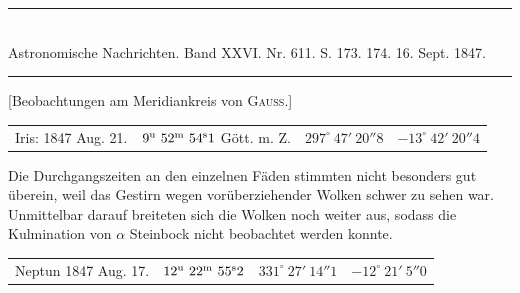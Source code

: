 \clearpage
{}
\begin{center}
\rule{0.55\linewidth}{0.4pt}\\[2pt]
Astronomische Nachrichten. Band XXVI. Nr. 611. S. 173. 174. 16. Sept. 1847.\\[2pt]
\rule{0.55\linewidth}{0.4pt}
\end{center}
\begin{center}[Beobachtungen am Meridiankreis von \textsc{Gauss}.]\end{center}

\begin{center}
\small
\setlength{\tabcolsep}{3pt}
\begin{tabular}{lrll}
Iris: 1847 Aug. 21. & $9^{\rm u}\ 52^{\rm m}\ 54^{\rm s}1$ Gött. m. Z. & $297^\circ\ 47'\ 20''8$ & $-13^\circ\ 42'\ 20''4$ \\
\end{tabular}
\end{center}

Die Durchgangszeiten an den einzelnen Fäden stimmten nicht besonders gut überein, weil das Gestirn wegen vorüberziehender Wolken schwer zu sehen war. Unmittelbar darauf breiteten sich die Wolken noch weiter aus, sodass die Kulmination von $\alpha$ Steinbock nicht beobachtet werden konnte.

\begin{center}
\small
\setlength{\tabcolsep}{4pt}
\begin{tabular}{lrrr}
Neptun 1847 Aug. 17. & $12^{\rm u}\ 22^{\rm m}\ 55^{\rm s}2$ & $331^\circ\ 27'\ 14''1$ & $-12^\circ\ 21'\ 5''0$ \\
\end{tabular}
\end{center}

